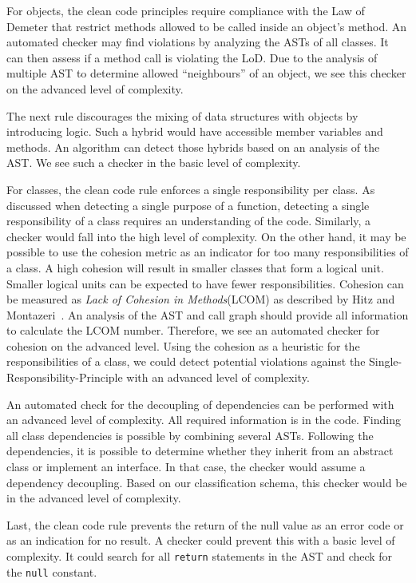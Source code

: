 For objects, the clean code principles require compliance with the Law of Demeter that restrict methods allowed to be called inside an object's method. An automated checker may find violations by analyzing the ASTs of all classes. It can then assess if a method call is violating the LoD. Due to the analysis of multiple AST to determine allowed \enquote{neighbours} of an object, we see this checker on the advanced level of complexity.

The next rule discourages the mixing of data structures with objects by introducing logic. Such a hybrid would have accessible member variables and methods. An algorithm can detect those hybrids based on an analysis of the AST. We see such a checker in the basic level of complexity.

For classes, the clean code rule enforces a single responsibility per class. As discussed when detecting a single purpose of a function, detecting a single responsibility of a class requires an understanding of the code. Similarly, a checker would fall into the high level of complexity. On the other hand, it may be possible to use the cohesion metric as an indicator for too many responsibilities of a class. A high cohesion will result in smaller classes that form a logical unit. Smaller logical units can be expected to have fewer responsibilities. Cohesion can be measured as \textit{Lack of Cohesion in Methods}(LCOM) as described by Hitz and Montazeri~\cite{Hitz95measuringcoupling}. An analysis of the AST and call graph should provide all information to calculate the LCOM number. Therefore, we see an automated checker for cohesion on the advanced level. Using the cohesion as a heuristic for the responsibilities of a class, we could detect potential violations against the Single-Responsibility-Principle with an advanced level of complexity.

An automated check for the decoupling of dependencies can be performed with an advanced level of complexity. All required information is in the code. Finding all class dependencies is possible by combining several ASTs. Following the dependencies, it is possible to determine whether they inherit from an abstract class or implement an interface. In that case, the checker would assume a dependency decoupling. Based on our classification schema, this checker would be in the advanced level of complexity.

Last, the clean code rule prevents the return of the null value as an error code or as an indication for no result. A checker could prevent this with a basic level of complexity. It could search for all \texttt{return} statements in the AST and check for the \texttt{null} constant.

